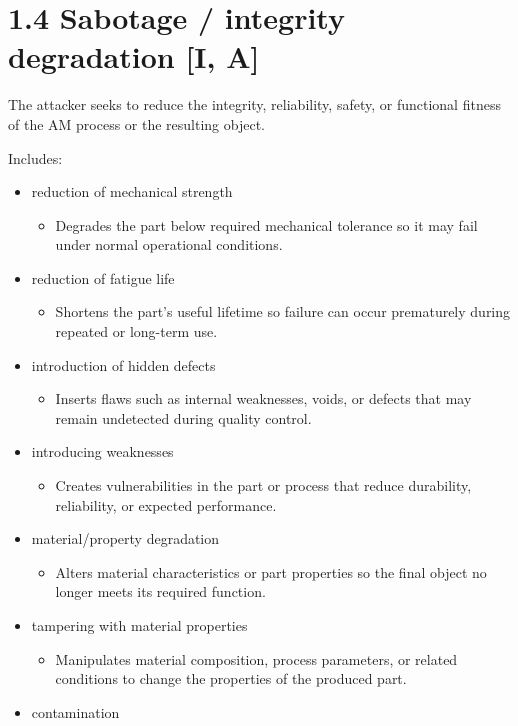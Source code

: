 \documentclass[10pt,a4paper,oneside]{report}
\begin{document}
\section{1.4 Sabotage / integrity degradation [I, A]}


The attacker seeks to reduce the integrity, reliability, safety, or functional fitness of the AM process or the resulting object.

Includes:

\begin{itemize}
\item reduction of mechanical strength
\begin{itemize}
\item Degrades the part below required mechanical tolerance so it may fail under normal operational conditions.
\end{itemize}
\item reduction of fatigue life
\begin{itemize}
\item Shortens the part's useful lifetime so failure can occur prematurely during repeated or long-term use.
\end{itemize}
\item introduction of hidden defects
\begin{itemize}
\item Inserts flaws such as internal weaknesses, voids, or defects that may remain undetected during quality control.
\end{itemize}
\item introducing weaknesses
\begin{itemize}
\item Creates vulnerabilities in the part or process that reduce durability, reliability, or expected performance.
\end{itemize}
\item material/property degradation
\begin{itemize}
\item Alters material characteristics or part properties so the final object no longer meets its required function.
\end{itemize}
\item tampering with material properties
\begin{itemize}
\item Manipulates material composition, process parameters, or related conditions to change the properties of the produced part.
\end{itemize}
\item contamination

\end{itemize}
\end{document}
